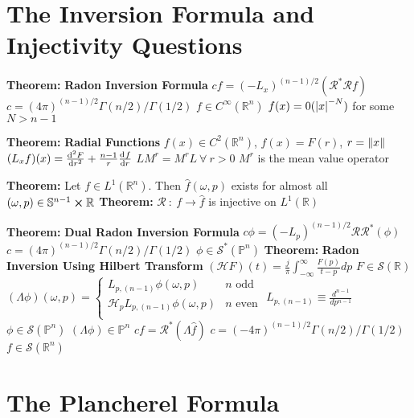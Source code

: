 \documentclass[14pt]{extarticle}
\def\Theorem{{\color{red} \textbf{Theorem:} }}
\begin{document}
\begin{outline}
	\section*{The Inversion Formula and Injectivity Questions}
		\1	\Theorem \textbf{Radon Inversion Formula}
			\2	$cf = (-L_x)^{(n-1)/2}(\mathcal{R}^*\mathcal{R}f)$
				\3	$c = (4\pi)^{(n-1)/2}\Gamma(n/2)/\Gamma(1/2)$
				\3	$f \in C^{\infty}(\mathbb{R}^n)$
				\3	$f(x) = 0(\abs{x}^{-N})$ for some $N > n-1$

		\1	\Theorem \textbf{Radial Functions}
			\2	$f(x) \in C^2(\mathbb{R}^n)$, $f(x) = F(r)$, $r = \norm{x}$
			\2	$(L_xf)(x) = \od[2]{F}{r} + \frac{n-1}{r}\od{f}{r}$
			\2	$LM^r = M^rL~\forall~r > 0$
				\3	$M^r$ is the mean value operator

		\1	\Theorem Let $f \in L^1(\mathbb{R}^n)$.  Then $\hat{f}(\omega,p)$ exists
				for almost all $(\omega,p) \in \mathbb{S}^{n-1} \cross \mathbb{R}$
		\1	\Theorem $\mathcal{R}~:~f \rightarrow \hat{f}$ is injective on $L^1(\mathbb{R})$

		\1	\Theorem \textbf{Dual Radon Inversion Formula}
			\2	$c\phi = (-L_p)^{(n-1)/2}\mathcal{R}\mathcal{R}^*(\phi)$
				\3	$c = (4\pi)^{(n-1)/2}\Gamma(n/2)/\Gamma(1/2)$
				\3	$\phi \in \mathcal{S}^*(\mathbb{P}^n)$
		\1	\Theorem \textbf{Radon Inversion Using Hilbert Transform}
			\2	$(\mathcal{H}F)(t) = \frac{j}{\pi}\int_{-\infty}^{\infty}\frac{F(p)}{t - p}dp$
				\3	$F \in \mathcal{S}(\mathbb{R})$
			\2	$(\Lambda \phi)(\omega,p) = \begin{cases}
																				L_{p,(n-1)} \phi(\omega,p) & n \text{ odd } \\
																				\mathcal{H}_p L_{p,(n-1)}\phi(\omega,p) & n \text{ even} \\
																			\end{cases}$
				\3	$L_{p,(n-1)} \equiv \frac{d^{n-1}}{dp^{n-1}}$
				\3	$\phi \in \mathcal{S}(\mathbb{P}^n)$
				\3	$(\Lambda \phi) \in \mathbb{P}^n$
			\2	$cf = \mathcal{R}^*(\Lambda \hat{f})$
				\3	$c = (-4\pi)^{(n-1)/2}\Gamma(n/2)/\Gamma(1/2)$
				\3	$f \in \mathcal{S}(\mathbb{R}^n)$
	
	\section*{The Plancherel Formula}
	\end{outline}
\end{document}
